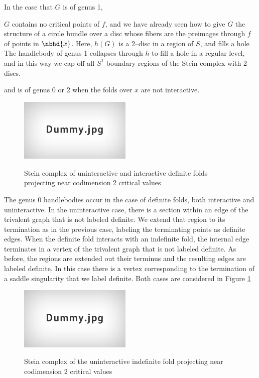
In the case that $G$ is of genus 1, 

$G$ contains no critical points of $f$, and we have already seen how to give $G$ the structure of a circle bundle over a disc whose fibers are the preimages through $f$ of points in $\nbhd{x}$.
Here, $h(G)$ is a 2--disc in a region of $S$, and fills a hole 
The handlebody of genus 1 collapses through $h$ to fill a hole in a regular level, and in this way we cap off all $S^1$ boundary regions of the Stein complex with 2--discs.

and is of genus 0 or 2 when the folds over $x$ are not interactive.


\begin{figure}
	\centering
	\captionsetup{justification=centering}
	\caption{Stein complex of uninteractive and interactive definite folds projecting near codimension 2 critical values}
	\includegraphics[height=3cm]{figures/dummy.jpg}
	\label{fig:codim2steindef}
\end{figure}

The genus 0 handlebodies occur in the case of definite folds, both interactive and uninteractive.
In the uninteractive case, there is a section within an edge of the trivalent graph that is not labeled definite.
We extend that region to its termination as in the previous case, labeling the terminating points as definite edges.
When the definite fold interacts with an indefinite fold, the internal edge terminates in a vertex of the trivalent graph that is not labeled definite.
As before, the regions are extended out their terminus and the resulting edges are labeled definite.
In this case there is a vertex corresponding to the termination of a saddle singularity that we label definite.
Both cases are considered in Figure \ref{fig:codim2steindef}

\begin{figure}
	\centering
	\captionsetup{justification=centering}
	\caption{Stein complex of the uninteractive indefinite fold projecting near codimension 2 critical values}
	\includegraphics[height=3cm]{figures/dummy.jpg}
	\label{fig:codim2steinindefun}
\end{figure}

